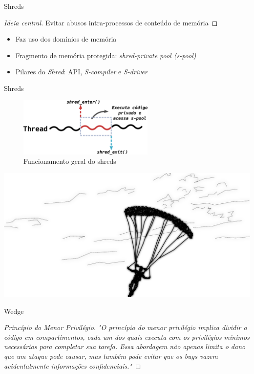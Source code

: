 \documentclass[xcolor={usenames,svgnames,dvipsnames},brazil,english,12pt,aspectratio=149]{beamer}
\begin{document}
\begin{frame}{Shreds}

  \begin{proof}[Ideia central]
Evitar abusos intra-processos de conteúdo de memória
  \end{proof}

  \begin{itemize}
    \item Faz uso dos domínios de memória
    \item Fragmento de memória protegida: \emph{shred-private pool (s-pool)}
    \item Pilares do \emph{Shred}: API, \emph{S-compiler} e \emph{S-driver}
  \end{itemize}

\end{frame}

\begin{frame}{Shreds}
  \begin{figure}[!h]
    \centering
    \includegraphics[width=0.6\textwidth]{shreds} 
    \caption*{Funcionamento geral do shreds}
  \end{figure}
\end{frame}

\begin{frame}[plain]
  \includegraphics[width=\textwidth]{presentation_cap2_three}
\end{frame}

\begin{frame}{Wedge}

  \begin{proof}[Princípio do Menor Privilégio]

\emph{"O princípio do menor privilégio implica dividir o código em compartimentos,
cada um dos quais executa com os privilégios mínimos necessários para completar
sua tarefa. Essa abordagem não apenas limita o dano que um ataque pode causar,
mas também pode evitar que os \emph{bugs} vazem acidentalmente informações
confidenciais."}%

  \end{proof}

\end{frame}
\end{document}
